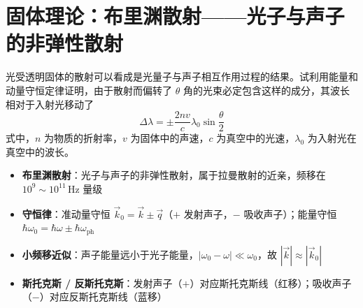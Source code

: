 \section{固体理论：布里渊散射——光子与声子的非弹性散射}
\label{sec:brillouin-scattering}

\begin{modelbox}[题目：光受透明固体的散射与声子相互作用]
光受透明固体的散射可以看成是光量子与声子相互作用过程的结果。试利用能量和动量守恒定律证明，由于散射而偏转了 $\theta$ 角的光束必定包含这样的成分，其波长相对于入射光移动了
\begin{equation}
\Delta\lambda = \pm\frac{2nv}{c}\lambda_0\sin\frac{\theta}{2}
\end{equation}
式中，$n$ 为物质的折射率，$v$ 为固体中的声速，$c$ 为真空中的光速，$\lambda_0$ 为入射光在真空中的波长。
\end{modelbox}

\begin{tipbox}[考点快速分析]
\begin{itemize}
    \item \textbf{布里渊散射}：光子与声子的非弹性散射，属于拉曼散射的近亲，频移在 $10^{9}\sim10^{11}\,\mathrm{Hz}$ 量级
    \item \textbf{守恒律}：准动量守恒 $\vec k_0 = \vec k \pm \vec q$（$+$ 发射声子，$-$ 吸收声子）；能量守恒 $\hbar\omega_0 = \hbar\omega \pm \hbar\omega_\mathrm{ph}$
    \item \textbf{小频移近似}：声子能量远小于光子能量，$|\omega_0 - \omega| \ll \omega_0$，故 $|\vec k| \approx |\vec k_0|$
    \item \textbf{斯托克斯 / 反斯托克斯}：发射声子（$+$）对应斯托克斯线（红移）；吸收声子（$-$）对应反斯托克斯线（蓝移）
\end{itemize}
\end{tipbox}

